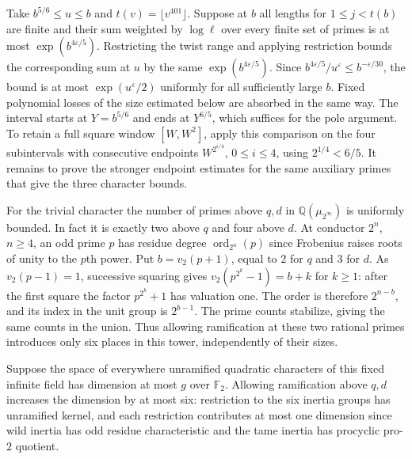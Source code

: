 \documentclass[11pt]{amsart}
\theoremstyle{definition}
\theoremstyle{remark}
\begin{document}
Take $b^{5/6}\le u\le b$ and $t(v)=\lfloor v^{401}\rfloor$.
Suppose at $b$ all lengths for $1\le j<t(b)$ are finite and their
sum weighted by $\log\ell$ over every finite set of primes is at
most $\exp(b^{4\varepsilon/5})$. Restricting the twist range
and applying restriction bounds the corresponding sum at $u$ by
the same $\exp(b^{4\varepsilon/5})$. Since
$b^{4\varepsilon/5}/u^\varepsilon\le b^{-\varepsilon/30}$,
the bound is at most $\exp(u^\varepsilon/2)$ uniformly for all
sufficiently large $b$. Fixed polynomial losses of the size
estimated below are absorbed in the same way. The interval starts
at $Y=b^{5/6}$ and ends at $Y^{6/5}$, which suffices for the pole
argument. To retain a full square window $[W,W^2]$, apply this
comparison on the four subintervals with consecutive endpoints
$W^{2^{i/4}}$, $0\le i\le4$, using $2^{1/4}<6/5$.
It remains to prove the stronger endpoint estimates for the same
auxiliary primes that give the three character bounds.

For the trivial character the number of primes above $q,d$ in
$\mathbb Q(\mu_{2^\infty})$ is uniformly bounded. In fact it is
exactly two above $q$ and four above $d$. At conductor $2^n$,
$n\ge4$, an odd prime $p$ has residue degree
$\operatorname{ord}_{2^n}(p)$ since Frobenius raises roots of
unity to the $p$th power. Put $b=v_2(p+1)$, equal to $2$ for
$q$ and $3$ for $d$. As $v_2(p-1)=1$, successive squaring gives
$v_2(p^{2^k}-1)=b+k$ for $k\ge1$: after the first square the
factor $p^{2^k}+1$ has valuation one. The order is therefore
$2^{n-b}$, and its index in the unit group is $2^{b-1}$.
The prime counts stabilize, giving the same counts in the union.
Thus allowing ramification at these two rational primes introduces
only six places in this tower, independently of their sizes.

Suppose the space of everywhere unramified quadratic characters
of this fixed infinite field has dimension at most $g$ over
$\mathbb F_2$. Allowing ramification above $q,d$ increases the
dimension by at most six: restriction to the six inertia groups
has unramified kernel, and each restriction contributes at most
one dimension since wild inertia has odd residue characteristic
and the tame inertia has procyclic pro-$2$ quotient.
\end{document}
